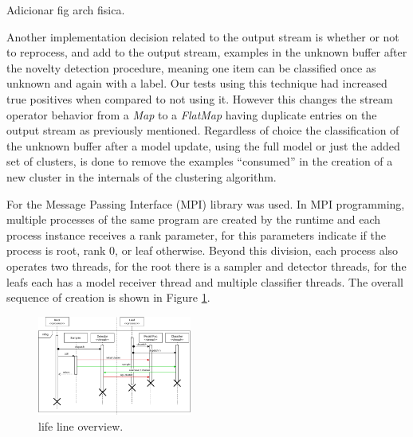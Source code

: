 \documentclass[conference]{IEEEtran}
\begin{document}

Adicionar fig arch fisica.

Another implementation decision related to the output stream is whether or not
to reprocess, and add to the output stream, examples in the unknown buffer after
the novelty detection procedure, meaning one item can be classified once as
unknown and again with a label.
Our tests using this technique had increased true positives when compared to
not using it.
However this changes the stream operator behavior from a \textit{Map} to a
\textit{FlatMap} having duplicate entries on the output stream as previously
mentioned.
Regardless of choice the classification of the unknown buffer after a model
update, using the full model or just the added set of clusters, is done to
remove the examples ``consumed'' in the creation of a new cluster in the internals
of the clustering algorithm.



\newcommand{\reffig}[1]{Figure \ref{fig:#1}\xspace}

For \mfog the Message Passing Interface (MPI) library was used.
In MPI programming, multiple processes of the same program are created by the
runtime and each process instance receives a rank parameter, for \mfog this
parameters indicate if the process is root, rank $0$, or leaf otherwise.
Beyond this division, each process also operates two threads, for the root
there is a sampler and detector threads, for the leafs each has a model receiver
thread and multiple classifier threads.
The overall sequence of creation is shown in \reffig{mfog-mpi-life}.

\begin{figure}[htbp]
  \centerline{\includegraphics[width=0.45\textwidth]{figures/mfog-arch-mpi.png}}
  \caption{\mfog life line overview.}
  \label{fig:mfog-mpi-life}
\end{figure}
\end{document}
